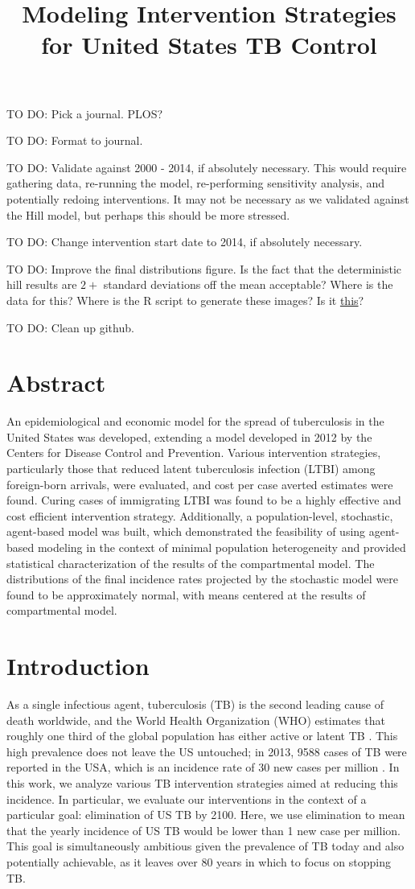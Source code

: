 \documentclass{amsart}
\title{Modeling Intervention Strategies for United States TB Control}
\renewcommand{\(}{\left(}
\renewcommand{\)}{\right)}
\newcommand{\TODO}[1]{\begin{framed}{\huge \color{red} TO DO:}
  #1 \end{framed}}
\begin{document}
\maketitle

\TODO{Pick a journal. PLOS?}
\TODO{Format to journal.}
\TODO{Validate against 2000 - 2014, if absolutely necessary. This would require
gathering data, re-running the model, re-performing sensitivity analysis, and
potentially redoing interventions. It may not be necessary as we validated
against the Hill model, but perhaps this should be more stressed.}
\TODO{Change intervention start date to 2014, if absolutely necessary.}
\TODO{Improve the final distributions figure. Is the fact that the deterministic
  hill results are $2+$ standard deviations off the mean acceptable? Where is
  the data for this? Where is the R script to generate these images? Is it
  \href{https://github.com/mmcdermott/disease-modeling/blob/master/in_progress/models/agentHillModel/cppStrictHill/HMDistributions.R}{this}?}
\TODO{Clean up github.}

\section{Abstract}
An epidemiological and economic model for the spread of tuberculosis in the
United States was developed, extending a model developed in 2012 by the Centers
for Disease Control and Prevention. Various intervention strategies,
particularly those that reduced latent tuberculosis infection (LTBI) among
foreign-born arrivals, were evaluated, and cost per case averted estimates were
found. Curing cases of immigrating LTBI was found to be a highly effective and
cost efficient intervention strategy. Additionally, a population-level,
stochastic, agent-based model was built, which demonstrated the feasibility of
using agent-based modeling in the context of minimal population heterogeneity
and provided statistical characterization of the results of the compartmental
model. The distributions of the final incidence rates projected by the
stochastic model were found to be approximately normal, with means centered at
the results of compartmental model.  

\section{Introduction}
As a single infectious agent, tuberculosis (TB) is the second leading cause of
death worldwide, and the World Health Organization (WHO) estimates that roughly
one third of the global population has either active or latent TB
\cite{_who_2013}. This high prevalence does not leave the US untouched; in 2013,
9588 cases of TB were reported in the USA, which is an incidence rate of 30 new
cases per million \cite{miramontes_trends_2013}. In this work, we analyze
various TB intervention strategies aimed at reducing this incidence. In
particular, we evaluate our interventions in the context of a particular goal:
elimination of US TB by 2100. Here, we use elimination to mean that the yearly
incidence of US TB would be lower than 1 new case per million. This goal is
simultaneously ambitious given the prevalence of TB today and also potentially
achievable, as it leaves over 80 years in which to focus on stopping TB.
\end{document}
